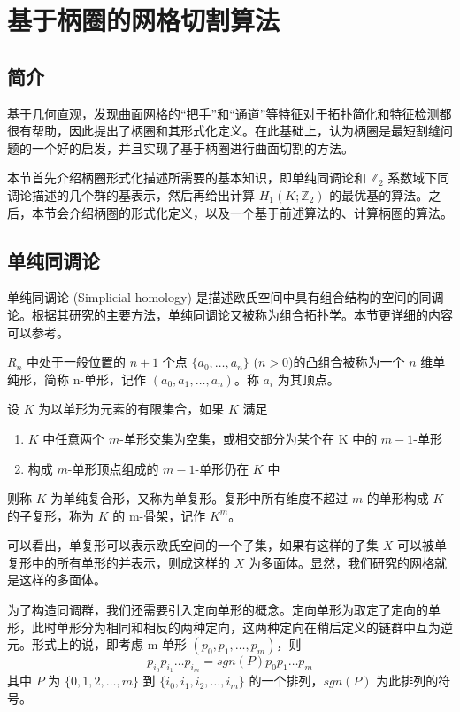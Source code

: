 
\chapter{基于柄圈的网格切割算法}

\section{简介}

\citet{oncomputinghantun} 基于几何直观，发现曲面网格的“把手”和“通道”等特征对于拓扑简化和特征检测都很有帮助，因此提出了柄圈和其形式化定义。在此基础上，\citet{Chai2018}认为柄圈是最短割缝问题的一个好的启发，并且实现了基于柄圈进行曲面切割的方法。

本节首先介绍柄圈形式化描述所需要的基本知识，即单纯同调论和 $ \mathbb{Z}_2 $ 系数域下同调论描述的几个群的基表示，然后再给出计算 $ H_1(K; \mathbb{Z}_2) $ 的最优基的算法。之后，本节会介绍柄圈的形式化定义，以及一个基于前述算法的、计算柄圈的算法。

\section{单纯同调论}

单纯同调论 (Simplicial homology) 是描述欧氏空间中具有组合结构的空间的同调论。根据其研究的主要方法，单纯同调论又被称为组合拓扑学。本节更详细的内容可以参考\cite{jctpxjy}。

$ R_n $ 中处于一般位置的 $ n + 1 $ 个点 $ \{a_0, \dots, a_n\} $ ($n > 0$)的凸组合被称为一个 $ n $ 维单纯形，简称 n-单形，记作 $ (a_0, a_1, \dots, a_n) $。称 $ a_i$ 为其顶点。

设 $ K $ 为以单形为元素的有限集合，如果 $ K $ 满足
\begin{enumerate}
    \item $ K $ 中任意两个 $m$-单形交集为空集，或相交部分为某个在 K 中的 $m-1$-单形
    \item 构成 $ m$-单形顶点组成的 $ m - 1 $-单形仍在 $ K $ 中
\end{enumerate}
则称 $ K $ 为单纯复合形，又称为单复形。复形中所有维度不超过 $ m $ 的单形构成 $ K $ 的子复形，称为 $ K $ 的 m-骨架，记作 $ K^m $。

可以看出，单复形可以表示欧氏空间的一个子集，如果有这样的子集 $ X $ 可以被单复形中的所有单形的并表示，则成这样的 $ X $ 为多面体。显然，我们研究的网格就是这样的多面体。

为了构造同调群，我们还需要引入定向单形的概念。定向单形为取定了定向的单形，此时单形分为相同和相反的两种定向，这两种定向在稍后定义的链群中互为逆元。形式上的说，即考虑 m-单形 $ (p_0, p_1, \dots, p_m) $，则 
$$ p_{i_0} p_{i_1} \dots p_{i_m} = sgn(P) p_{0} p_{1} \dots p_{m} $$
其中 $ P $ 为 $ \{0, 1, 2, \dots, m \} $ 到 $ \{i_0, i_1, i_2, \dots, i_m \} $ 的一个排列，$ sgn(P) $ 为此排列的符号。

